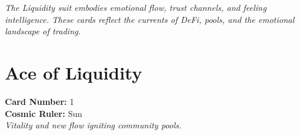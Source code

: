 \documentclass[11pt,oneside]{book}
\begin{document}
\textit{The Liquidity suit embodies emotional flow, trust channels, and feeling intelligence. These cards reflect the currents of DeFi, pools, and the emotional landscape of trading.}

\newpage
\section*{Ace of Liquidity}

\begin{minipage}[t]{0.55\textwidth}
  \vspace{0pt}
  \textbf{Card Number:} 1\\  \textbf{Cosmic Ruler:} Sun\\  \textit{Vitality and new flow igniting community pools.}
\end{minipage}
\end{document}
